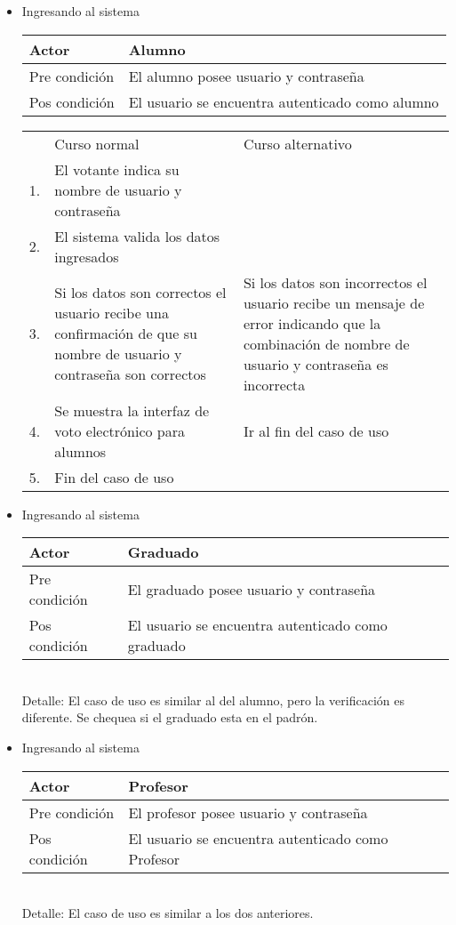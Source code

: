 \begin{itemize}

\bigskip
\item Ingresando al sistema
\bigskip
\begin{center}
\begin{tabular}{ll}
Actor & Alumno \\
\hline
Pre condición & El alumno posee usuario y contraseña \\
\hline
Pos condición & El usuario se encuentra autenticado como alumno\\
\hline
\end{tabular}
\medskip
\begin{tabular}{c p{4cm}|p{4cm}}
 & Curso normal & Curso alternativo \\
 1. & El votante indica su nombre de usuario y contraseña &  \\
 2. & El sistema valida los datos ingresados & \\
 3. & Si los datos son correctos el usuario recibe una confirmación de que su nombre de usuario y contraseña son correctos & Si los datos son incorrectos el usuario recibe un mensaje de error indicando que la combinación de nombre de usuario y contraseña es incorrecta \\
 4. & Se muestra la interfaz de voto electrónico para alumnos & Ir al fin del caso de uso \\
 5. & Fin del caso de uso& \\ 
\end{tabular}
\end{center}

\bigskip
\item Ingresando al sistema
\bigskip
\begin{center}
\begin{tabular}{ll}
Actor & Graduado \\
\hline
Pre condición & El graduado posee usuario y contraseña \\
\hline
Pos condición & El usuario se encuentra autenticado como graduado\\
\hline
\end{tabular}
\\
Detalle: El caso de uso es similar al del alumno, pero la verificación es diferente. Se chequea si el graduado esta en el padrón.
\end{center}

\bigskip
\item Ingresando al sistema
\bigskip
\begin{center}
\begin{tabular}{ll}
Actor & Profesor \\
\hline
Pre condición & El profesor posee usuario y contraseña \\
\hline
Pos condición & El usuario se encuentra autenticado como Profesor\\
\hline
\end{tabular}
\\
Detalle: El caso de uso es similar a los dos anteriores.
\end{center}


\end{itemize}
